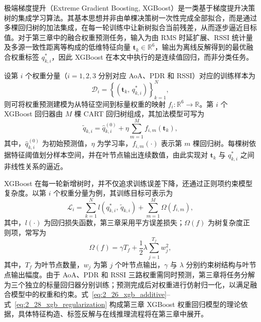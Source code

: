 极端梯度提升（Extreme Gradient Boosting, XGBoost）是一类基于梯度提升决策树的集成学习算法\cite{Chen2016XGBoost}。其基本思想并非由单棵决策树一次性完成全部拟合，而是通过多棵回归树的加法集成，在每一轮训练中让新树拟合当前残差，从而逐步逼近目标值。对于第三章中的融合权重预测任务，输入为由 RMS 时延扩展、RSSI 统计量及多源一致性距离等构成的低维特征向量 $\mathbf{t}_k\in\mathbb{R}^{6}$，输出为离线反解得到的最优融合权重标签 $q_{k,i}^{\ast}$，因此 XGBoost 在本文中执行的是连续值回归，而非分类任务。

设第 $i$ 个权重分量（$i=1,2,3$ 分别对应 AoA、PDR 和 RSSI）对应的训练样本为
\begin{equation}
\mathcal{D}_i
=
\left\{
\left(\mathbf{t}_k,\,q_{k,i}^{\ast}\right)
\right\}_{k=1}^{N},
\label{eq:2_25_xgb_dataset}
\end{equation}
则可将权重预测建模为从特征空间到标量权重的映射 $f_i:\mathbb{R}^{6}\rightarrow\mathbb{R}$。第 $i$ 个 XGBoost 回归器由 $M$ 棵 CART 回归树组成，其加法模型可写为
\begin{equation}
\tilde{q}_{k,i}
=
\hat{q}_{k,i}^{(0)}
+
\eta
\sum_{m=1}^{M}
f_{i,m}(\mathbf{t}_k),
\label{eq:2_26_xgb_additive}
\end{equation}
其中，$\hat{q}_{k,i}^{(0)}$ 为初始预测值，$\eta$ 为学习率，$f_{i,m}(\cdot)$ 表示第 $m$ 棵回归树。每棵树依据特征阈值划分样本空间，并在叶节点输出连续数值，由此实现对 $\mathbf{t}_k$ 与 $q_{k,i}^{\ast}$ 之间非线性关系的逼近。

XGBoost 在每一轮新增树时，并不仅追求训练误差下降，还通过正则项约束模型复杂度。以第 $i$ 个权重分量为例，其训练目标可表示为
\begin{equation}
\mathcal{L}_i
=
\sum_{k=1}^{N}
l\left(q_{k,i}^{\ast},\,\tilde{q}_{k,i}\right)
+
\sum_{m=1}^{M}
\Omega(f_{i,m}),
\label{eq:2_27_xgb_objective}
\end{equation}
其中，$l(\cdot)$ 为回归损失函数，第三章采用平方误差损失；$\Omega(f)$ 为树复杂度正则项，常写为
\begin{equation}
\Omega(f)
=
\gamma T_f
+
\frac{1}{2}
\lambda
\sum_{j=1}^{T_f}
w_j^2,
\label{eq:2_28_xgb_regularization}
\end{equation}
其中，$T_f$ 为叶节点数量，$w_j$ 为第 $j$ 个叶节点输出，$\gamma$ 与 $\lambda$ 分别约束树结构与叶节点输出幅度。由于 AoA、PDR 和 RSSI 三路权重需同时预测，第三章将任务分解为三个独立的标量回归器分别训练；预测完成后对权重进行仿射归一化，以满足融合模型中的权重和约束。式~\eqref{eq:2_26_xgb_additive}--式~\eqref{eq:2_28_xgb_regularization} 构成第三章 XGBoost 权重回归模型的理论依据，具体特征构造、标签反解与在线推理流程将在第三章中展开。

